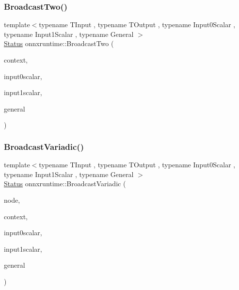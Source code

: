 \mbox{\label{namespaceonnxruntime_a9a929616f7dda34b229406547264d336}} 
\subsubsection{\texorpdfstring{Broadcast\+Two()}{BroadcastTwo()}}
{\footnotesize\ttfamily template$<$typename T\+Input , typename T\+Output , typename Input0\+Scalar , typename Input1\+Scalar , typename General $>$ \\
\mbox{\hyperlink{classonnxruntime_1_1common_1_1Status}{Status}} onnxruntime\+::\+Broadcast\+Two (\begin{DoxyParamCaption}\item[{\mbox{\hyperlink{classonnxruntime_1_1OpKernelContext}{Op\+Kernel\+Context}} \&}]{context,  }\item[{Input0\+Scalar}]{input0scalar,  }\item[{Input1\+Scalar}]{input1scalar,  }\item[{General}]{general }\end{DoxyParamCaption})}

\mbox{\label{namespaceonnxruntime_a70e606a96056237abaae81b61c5f4d4f}} 
\subsubsection{\texorpdfstring{Broadcast\+Variadic()}{BroadcastVariadic()}}
{\footnotesize\ttfamily template$<$typename T\+Input , typename T\+Output , typename Input0\+Scalar , typename Input1\+Scalar , typename General $>$ \\
\mbox{\hyperlink{classonnxruntime_1_1common_1_1Status}{Status}} onnxruntime\+::\+Broadcast\+Variadic (\begin{DoxyParamCaption}\item[{const \mbox{\hyperlink{classonnxruntime_1_1Node}{Node}} \&}]{node,  }\item[{\mbox{\hyperlink{classonnxruntime_1_1OpKernelContext}{Op\+Kernel\+Context}} \&}]{context,  }\item[{Input0\+Scalar}]{input0scalar,  }\item[{Input1\+Scalar}]{input1scalar,  }\item[{General}]{general }\end{DoxyParamCaption})}

